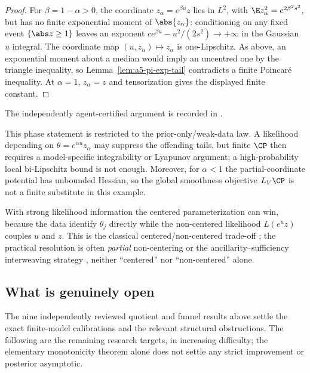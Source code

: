 \documentclass[../../main.tex]{subfiles}
\begin{document}
\begin{proof}
For $\beta=1-\alpha>0$, the coordinate $z_\alpha=e^{\beta u}z$ lies in $L^2$, with
$\E z_\alpha^2=e^{2\beta^2s^2}$, but has no finite exponential moment of
$\abs{z_\alpha}$: conditioning on any fixed event $\{\abs z\ge1\}$ leaves an exponent
$ce^{\beta u}-u^2/(2s^2)\to+\infty$ in the Gaussian $u$ integral. The coordinate map
$(u,z_\alpha)\mapsto z_\alpha$ is
one-Lipschitz. As above, an exponential moment about a median would imply an uncentred one by
the triangle inequality, so Lemma~\ref{lem:a5-pi-exp-tail} contradicts a finite Poincar\'e
inequality.
At $\alpha=1$, $z_\alpha=z$ and tensorization
gives the displayed finite constant.
\end{proof}

\noindent The independently agent-certified argument is recorded in
.

This phase statement is restricted to the prior-only/weak-data law. A likelihood depending on
$\theta=e^{\alpha u}z_\alpha$ may suppress the offending tails, but finite $\CP$ then requires a
model-specific integrability or Lyapunov argument; a high-probability local bi-Lipschitz bound is
not enough. Moreover, for $\alpha<1$ the partial-coordinate potential has unbounded Hessian, so
the global smoothness objective $L_V\CP$ is not a finite substitute in this example.

\begin{warning}
\label{warn:a5-ncp}
With strong likelihood information the centered parameterization can win, because the data
identify $\theta_j$ directly while the non-centered likelihood $L(e^uz)$ couples $u$ and $z$.
This is the classical centered/non-centered trade-off
\cite{PapaspiliopoulosRobertsSkold2007}; the practical resolution is often \emph{partial}
non-centering or the ancillarity--sufficiency interweaving strategy \cite{YuMeng2011}, neither
``centered'' nor ``non-centered'' alone.
\end{warning}

\subsection{What is genuinely open}
\label{subsec:a5-open}

The nine independently reviewed quotient and funnel results above settle the exact finite-model
calibrations and the relevant structural obstructions. The following are the remaining research
targets, in increasing difficulty; the elementary monotonicity theorem alone does not settle any
strict improvement or posterior asymptotic.
\end{document}
